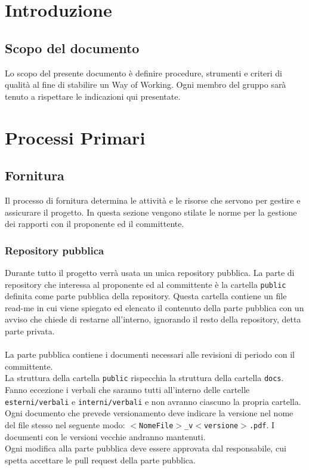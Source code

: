 \documentclass[a4paper, 12pt]{article}
\begin{document}
\makefrontpage

\makeversioni

\tableofcontents
\pagebreak

\section{Introduzione}
\subsection{Scopo del documento}
Lo scopo del presente documento è definire procedure, strumenti e criteri di qualità al fine di stabilire un Way of Working. Ogni membro del gruppo sarà tenuto a rispettare le indicazioni qui presentate.


\section{Processi Primari}
\subsection{Fornitura}\label{fornitura}
Il processo di fornitura determina le attività e le risorse che servono per gestire e assicurare il progetto. In questa sezione vengono stilate le norme per la gestione dei rapporti con il proponente ed il committente.
\subsubsection{Repository pubblica}
Durante tutto il progetto verrà usata un unica repository pubblica. La parte di repository che interessa al proponente ed al committente è la cartella \texttt{public} definita come parte pubblica della repository. Questa cartella contiene un file read-me in cui viene spiegato ed elencato il contenuto della parte pubblica con un avviso che chiede di restarne all'interno, ignorando il resto della repository, detta parte privata.\\\\
La parte pubblica contiene i documenti necessari alle revisioni di periodo con il committente.\\
La struttura della cartella \texttt{public} rispecchia la struttura della cartella \texttt{docs}. Fanno eccezione i verbali che saranno tutti all'interno delle cartelle \texttt{esterni/verbali} e \texttt{interni/verbali} e non avranno ciascuno la propria cartella.\\
Ogni documento che prevede versionamento deve indicare la versione nel nome del file stesso nel seguente modo: \texttt{$<$NomeFile$>$\_v$<$versione$>$.pdf}. I documenti con le versioni vecchie andranno mantenuti. \\
Ogni modifica alla parte pubblica deve essere approvata dal responsabile, cui spetta accettare le pull request della parte pubblica.
\end{document}
